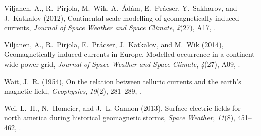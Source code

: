 \documentclass[linenumbers,draft]{agujournal}
\begin{document}
\begin{thebibliography}{28}
{Viljanen}, A., R.~{Pirjola}, M.~{Wik}, A.~{{\'A}d{\'a}m}, E.~{Pr{\'a}cser},
  Y.~{Sakharov}, and J.~{Katkalov} (2012), {Continental scale modelling of
  geomagnetically induced currents}, \textit{Journal of Space Weather and Space
  Climate}, \textit{2}(27), A17, .

{Viljanen}, A., R.~{Pirjola}, E.~{Pr{\'a}cser}, J.~{Katkalov}, and M.~{Wik}
  (2014), {Geomagnetically induced currents in Europe. Modelled occurrence in a
  continent-wide power grid}, \textit{Journal of Space Weather and Space
  Climate}, \textit{4}(27), A09, .

Wait, J.~R. (1954), On the relation between telluric currents and the earth's
  magnetic field, \textit{Geophysics}, \textit{19}(2), 281--289,
  .

Wei, L.~H., N.~Homeier, and J.~L. Gannon (2013), Surface electric fields for
  north america during historical geomagnetic storms, \textit{Space Weather},
  \textit{11}(8), 451--462, .

\end{thebibliography}

\clearpage
\end{document}
